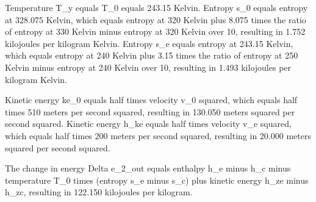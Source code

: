Temperature T_y equals T_0 equals 243.15 Kelvin. Entropy s_0 equals entropy at 328.075 Kelvin, which equals entropy at 320 Kelvin plus 8.075 times the ratio of entropy at 330 Kelvin minus entropy at 320 Kelvin over 10, resulting in 1.752 kilojoules per kilogram Kelvin. Entropy s_e equals entropy at 243.15 Kelvin, which equals entropy at 240 Kelvin plus 3.15 times the ratio of entropy at 250 Kelvin minus entropy at 240 Kelvin over 10, resulting in 1.493 kilojoules per kilogram Kelvin.

Kinetic energy ke_0 equals half times velocity v_0 squared, which equals half times 510 meters per second squared, resulting in 130.050 meters squared per second squared. Kinetic energy h_ke equals half times velocity v_e squared, which equals half times 200 meters per second squared, resulting in 20.000 meters squared per second squared.

The change in energy Delta e_2_out equals enthalpy h_e minus h_c minus temperature T_0 times (entropy s_e minus s_c) plus kinetic energy h_ze minus h_zc, resulting in 122.150 kilojoules per kilogram.